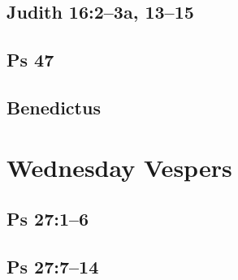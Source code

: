 {%
\parindent 0pt
\noindent
\ifx\preLilyPondExample \undefined
\else
  \expandafter\preLilyPondExample
\fi
\def\lilypondbook{}%

\ifx\postLilyPondExample \undefined
\else
  \expandafter\postLilyPondExample
\fi
}

\subsection{Judith 16:2--3a, 13--15}

{%
\parindent 0pt
\noindent
\ifx\preLilyPondExample \undefined
\else
  \expandafter\preLilyPondExample
\fi
\def\lilypondbook{}%

\ifx\postLilyPondExample \undefined
\else
  \expandafter\postLilyPondExample
\fi
}

\subsection{Ps 47}

{%
\parindent 0pt
\noindent
\ifx\preLilyPondExample \undefined
\else
  \expandafter\preLilyPondExample
\fi
\def\lilypondbook{}%

\ifx\postLilyPondExample \undefined
\else
  \expandafter\postLilyPondExample
\fi
}

\subsection{Benedictus}

{%
\parindent 0pt
\noindent
\ifx\preLilyPondExample \undefined
\else
  \expandafter\preLilyPondExample
\fi
\def\lilypondbook{}%

\ifx\postLilyPondExample \undefined
\else
  \expandafter\postLilyPondExample
\fi
}


\section{Wednesday Vespers}

\subsection{Ps 27:1--6}

{%
\parindent 0pt
\noindent
\ifx\preLilyPondExample \undefined
\else
  \expandafter\preLilyPondExample
\fi
\def\lilypondbook{}%

\ifx\postLilyPondExample \undefined
\else
  \expandafter\postLilyPondExample
\fi
}

\subsection{Ps 27:7--14}

